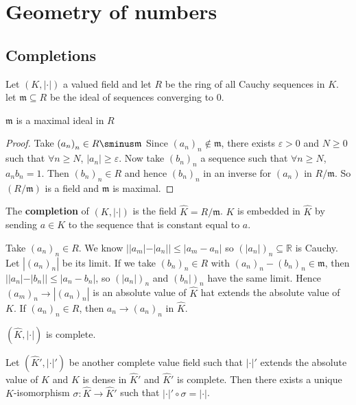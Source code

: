 \chapter{Geometry of numbers}
\section{Completions}
Let \({(K, |\cdot|)}\) a valued field and let \(R\) be the ring of all
Cauchy sequences in \(K\). let \(\mathfrak{m} \subseteq R \) be the ideal of
sequences converging to 0.

\begin{lemma}{}
    \(\mathfrak{m}\) is a maximal ideal in \(R\) 
\end{lemma}
\begin{proof}{}
    Take \({(a_{n})}_n \in  R \sminus \mathfrak{m} \) Since \({(a_{n})}_n
    \not\in \mathfrak{m}\), there exists \(\varepsilon > 0\) and \(N \ge 0\)
    such that \(\forall n \ge N\), \(|a_{n}| \ge \varepsilon\). Now take
    \({(b_{n})}_n\) a sequence such that \(\forall n \ge N\), \(a_{n}b_{n} =
    1\). Then \({(b_{n})}_n \in R\) and hence \({(b_{n})}_n\) in an inverse for
    \({(a_{n})}\) in \(R / \mathfrak{m}\). So \({(R / \mathfrak{m})}\) is a
    field and \(\mathfrak{m}\) is maximal.
\end{proof}

\begin{definition}{}
    The \textbf{completion} of \({(K, |\cdot|)}\) is the field \(\widehat{K} = R
    /\mathfrak{m}\). \(K\) is embedded in \(\widehat{K}\) by sending \(a \in K\)
    to the sequence that is constant equal to \(a\).
\end{definition}

Take \({(a_{n})}_n \in R\). We know \(||a_{m}| - |a_{n}|| \le |a_{m} - a_{n}|\)
so \({(|a_{n}|)}_n \subseteq \mathbb{R} \) is Cauchy. Let \(|{(a_{n})}_n|\) be
its limit. If we take \({(b_{n})}_n \in R\) with \({(a_{n})}_n - {(b_{n})}_n \in
\mathfrak{m}\), then \(||a_{n}| - |b_{n}|| \le |a_{n} - b_{n}|\), so
\({(|a_{n}|)}_n\) and \({(b_{n}|)}_n\) have the same limit. Hence \({(a_{m})}_n
\to |{(a_{n})}_n|\) is an absolute value of \(\widehat{K}\) hat extends the
absolute value of \(K\). If \({(a_{n})}_n \in R\), then \(a_{n} \to
{(a_{n})}_n\) in \(\widehat{K}\).

\begin{proposition}{}
    \({(\widehat{K}, |\cdot |)}\) is complete.
\end{proposition}

\begin{remark}{}
    Let \({(\widehat{K}', |\cdot |')}\) be another complete value field such
    that \(|\cdot |'\) extends the absolute value of \(K\) and \(K\) is dense in
    \(\widehat{K}'\) and \(\widehat{K}'\) is complete. Then there exists a
    unique \(K\)-isomorphism \(\sigma : \widehat{K} \to \widehat{K}'\) such that
    \(|\cdot |' \circ \sigma = |\cdot |\).
\end{remark}

